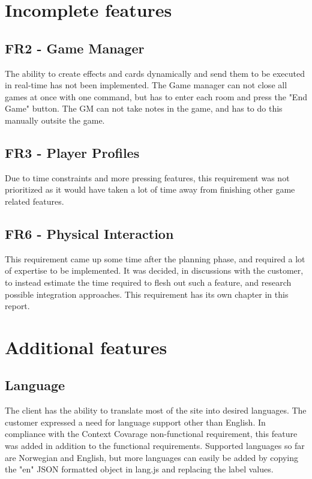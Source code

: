 \section{Incomplete features}


\subsection{FR2 - Game Manager}
The ability to create effects and cards dynamically and send them to be executed in real-time has not been implemented. The Game manager can not close all games at once with one command, but has to enter each room and press the "End Game" button. The GM can not take notes in the game, and has to do this manually outsite the game.\\

\subsection{FR3 - Player Profiles}
Due to time constraints and more pressing features, this requirement was not prioritized as it would have taken a lot of time away from finishing other game related features.\\

\subsection{FR6 - Physical Interaction}
This requirement came up some time after the planning phase, and required a lot of expertise to be implemented. It was decided, in discussions with the customer, to instead estimate the time required to flesh out such a feature, and research possible integration approaches. This requirement has its own chapter in this report.\\

\section{Additional features}


\subsection{Language}
The client has the ability to translate most of the site into desired languages. The customer expressed a need for language support other than English. In compliance with the Context Covarage non-functional requirement, this feature was added in addition to the functional requirements. Supported languages so far are Norwegian and English, but more languages can easily be added by copying the "en" JSON formatted object in lang.js and replacing the label values.\\


